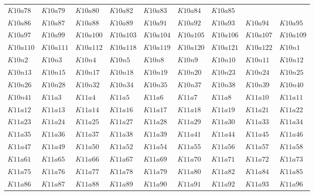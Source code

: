 \documentclass{amsart} %
\theoremstyle{thm}
\theoremstyle{definition}
\numberwithin{equation}{section}
\begin{document}
{\begin{longtable}{@{}lllllllll@{}}
  $K10a78$ &  
  $K10a79$ &  
  $K10a80$ &  
  $K10a82$ &  
  $K10a83$ &  
  $K10a84$ &  
  $K10a85$ \\   
  $K10a86$ &  
  $K10a87$ &  
  $K10a88$ &  
  $K10a89$ &  
  $K10a91$ &  
  $K10a92$ &  
  $K10a93$ &  
  $K10a94$ &  
  $K10a95$ \\   
  $K10a97$ &  
  $K10a99$ &  
  $K10a100$ &  
  $K10a103$ &  
  $K10a104$ &  
  $K10a105$ &  
  $K10a106$ &  
  $K10a107$ &  
  $K10a109$ \\   
  $K10a110$ &  
  $K10a111$ &  
  $K10a112$ &  
  $K10a118$ &  
  $K10a119$ &  
  $K10a120$ &  
  $K10a121$ &  
  $K10a122$ &  
  $K10n1$ \\   
  $K10n2$ &  
  $K10n3$ &  
  $K10n4$ &  
  $K10n5$ &  
  $K10n8$ &  
  $K10n9$ &  
  $K10n10$ &  
  $K10n11$ &  
  $K10n12$ \\   
  $K10n13$ &  
  $K10n15$ &  
  $K10n17$ &  
  $K10n18$ &  
  $K10n19$ &  
  $K10n20$ &  
  $K10n23$ &  
  $K10n24$ &  
  $K10n25$ \\   
  $K10n26$ &  
  $K10n28$ &  
  $K10n32$ &  
  $K10n34$ &  
  $K10n35$ &  
  $K10n37$ &  
  $K10n38$ &  
  $K10n39$ &  
  $K10n40$ \\   
  $K10n41$ &  
  $K11a3$ &  
  $K11a4$ &  
  $K11a5$ &  
  $K11a6$ &  
  $K11a7$ &  
  $K11a8$ &  
  $K11a10$ &  
  $K11a11$ \\   
  $K11a12$ &  
  $K11a13$ &  
  $K11a14$ &  
  $K11a16$ &  
  $K11a17$ &  
  $K11a18$ &  
  $K11a19$ &  
  $K11a21$ &  
  $K11a22$ \\   
  $K11a23$ &  
  $K11a24$ &  
  $K11a25$ &  
  $K11a27$ &  
  $K11a28$ &  
  $K11a29$ &  
  $K11a30$ &  
  $K11a33$ &  
  $K11a34$ \\   
  $K11a35$ &  
  $K11a36$ &  
  $K11a37$ &  
  $K11a38$ &  
  $K11a39$ &  
  $K11a41$ &  
  $K11a44$ &  
  $K11a45$ &  
  $K11a46$ \\   
  $K11a47$ &  
  $K11a49$ &  
  $K11a50$ &  
  $K11a52$ &  
  $K11a54$ &  
  $K11a55$ &  
  $K11a56$ &  
  $K11a57$ &  
  $K11a58$ \\   
  $K11a61$ &  
  $K11a65$ &  
  $K11a66$ &  
  $K11a67$ &  
  $K11a69$ &  
  $K11a70$ &  
  $K11a71$ &  
  $K11a72$ &  
  $K11a73$ \\   
  $K11a75$ &  
  $K11a76$ &  
  $K11a77$ &  
  $K11a78$ &  
  $K11a79$ &  
  $K11a80$ &  
  $K11a82$ &  
  $K11a84$ &  
  $K11a85$ \\   
  $K11a86$ &  
  $K11a87$ &  
  $K11a88$ &  
  $K11a89$ &  
  $K11a90$ &  
  $K11a91$ &  
  $K11a92$ &  
  $K11a93$ &  
  $K11a96$ \\   

\end{longtable}}
\end{document}
